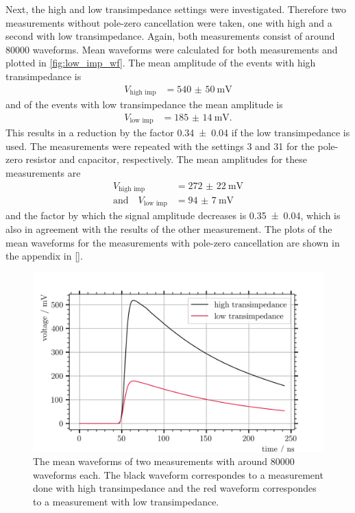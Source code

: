 Next, the high and low transimpedance settings were investigated.
Therefore two measurements without pole-zero cancellation were taken, one with high and a second with low transimpedance.
Again, both measurements consist of around \num{80000} waveforms.
Mean waveforms were calculated for both measurements and plotted in \autoref{fig:low_imp_wf}.
The mean amplitude of the events with high transimpedance is
\begin{align}
	V_\text{high imp} &= \SI{540(50)}{\milli\volt}
\end{align}
and of the events with low transimpedance the mean amplitude is
\begin{align}
	V_\text{low imp} &= \SI{185(14)}{\milli\volt}.
\end{align}
This results in a reduction by the factor \num{0.34(4)} if the low transimpedance is used.
The measurements were repeated with the settings 3 and 31 for the pole-zero resistor and capacitor, respectively.
The mean amplitudes for these measurements are
\begin{align}
	V_\text{high imp} &= \SI{272(22)}{\milli\volt}\\
	\text{and}\quad V_\text{low imp} &= \SI{94(7)}{\milli\volt}
\end{align}
and the factor by which the signal amplitude decreases is \num{0.35(4)}, which is also in agreement with the results of the other measurement.
The plots of the mean waveforms for the measurements with pole-zero cancellation are shown in the appendix in \autoref{}.
\begin{figure}
	\centering
	\includegraphics[width=1.\textwidth]{pictures/low_imp_mean_wf}
	\caption[Waveforms measured with low and high transimpedance]{The mean waveforms of two measurements with around \num{80000} waveforms each. The black waveform correspondes to a measurement done with high transimpedance and the red waveform correspondes to a measurement with low transimpedance.}
	\label{fig:low_imp_wf}
\end{figure}

